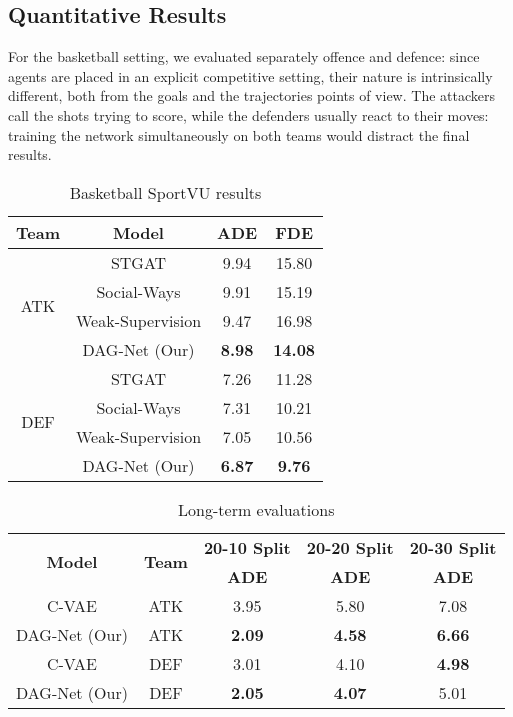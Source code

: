 \documentclass[10pt,a4paper,conference]{IEEEtran}
\begin{document}
\subsection{Quantitative Results}
For the basketball setting, we evaluated separately offence and defence: since agents are placed in an explicit competitive setting, their nature is intrinsically different, both from the goals and the trajectories points of view. The attackers call the shots trying to score, while the defenders usually react to their moves: training the network simultaneously on both teams would distract the final results. 


\begin{table}[!t]
    \renewcommand{\arraystretch}{1.3}
    \centering
    \caption{Basketball SportVU results}
     \label{sportvu_results}
    \begin{tabular}{c|c|cc}
        \hline
        \textbf{Team} & \textbf{Model} & \textbf{ADE} & \textbf{FDE}\\
        \hline \hline
                \multirow{4}{*}{ATK}&STGAT \cite{stgat} & 9.94 & 15.80\\
                & Social-Ways \cite{socialways} & 9.91 & 15.19\\
                & Weak-Supervision \cite{weeksup} & 9.47 & 16.98\\
                & DAG-Net (Our) & \textbf{8.98} & \textbf{14.08}\\
        \hline
                \multirow{4}{*}{DEF}&STGAT \cite{stgat} & 7.26 & 11.28\\
                & Social-Ways \cite{socialways} & 7.31 & 10.21\\
                & Weak-Supervision \cite{weeksup} & 7.05 & 10.56\\
                & DAG-Net (Our) & \textbf{6.87} & \textbf{9.76}\\
        \hline
    \end{tabular}
\end{table}

\begin{table}[!t]
    \renewcommand{\arraystretch}{1.3}
    \centering
    \caption{Long-term evaluations}
    \label{ours_vs_cvae_long_term}
    \begin{tabular}{c|c|ccc}
        \hline
         \multirow{2}{*}{\textbf{Model}} & \multirow{2}{*}{\textbf{Team}} & \textbf{20-10 Split} & \textbf{20-20 Split} &\textbf{20-30 Split} \\
         && \textbf{ADE} &  \textbf{ADE} &  \textbf{ADE} \\
        \hline \hline
                C-VAE \cite{where_will_they_go} & ATK & 3.95 & 5.80 & 7.08 \\
                DAG-Net (Our) & ATK & \textbf{2.09} & \textbf{4.58} & \textbf{6.66} \\
        \hline
                C-VAE \cite{where_will_they_go} & DEF & 3.01 & 4.10 & \textbf{4.98} \\
                DAG-Net (Our) & DEF & \textbf{2.05} & \textbf{4.07} & 5.01 \\
        \hline
    \end{tabular}
\end{table}
\end{document}
